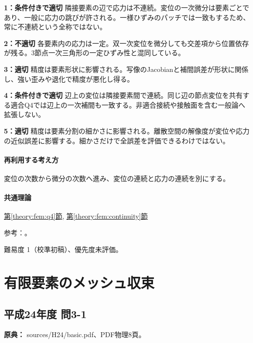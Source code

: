 \noindent\textbf{1：条件付きで適切} 隣接要素の辺で応力は不連続。変位の一次微分は要素ごとであり、一般に応力の跳びが許される。一様ひずみのパッチでは一致もするため、常に不連続という全称ではない。\par

\noindent\textbf{2：不適切} 各要素内の応力は一定。双一次変位を微分しても交差項から位置依存が残る。3節点一次三角形の一定ひずみ性と混同している。\par

\noindent\textbf{3：適切} 精度は要素形状に影響される。写像のJacobianと補間誤差が形状に関係し、強い歪みや退化で精度が悪化し得る。\par

\noindent\textbf{4：条件付きで適切} 辺上の変位は隣接要素間で連続。同じ辺の節点変位を共有する適合Q4では辺上の一次補間も一致する。非適合接続や接触面を含む一般論へ拡張しない。\par

\noindent\textbf{5：適切} 精度は要素分割の細かさに影響される。離散空間の解像度が変位や応力の近似誤差に影響する。細かさだけで全誤差を評価できるわけではない。\par

\paragraph{再利用する考え方} 変位の次数から微分の次数へ進み、変位の連続と応力の連続を別にする。

\paragraph{共通理論} \hyperref[theory:fem:q4]{第\ref*{theory:fem:q4}節}, \hyperref[theory:fem:continuity]{第\ref*{theory:fem:continuity}節}

\par 参考：\cite{mit_roy_fea1999}。

\par 難易度 1（校準初稿）、優先度未評価。

\section{有限要素のメッシュ収束}

\subsection{平成24年度 問3-1}
\label{q:h24-reg-basic-3-1}

\noindent\textbf{原典：} sources/H24/basic.pdf、PDF物理8頁。

